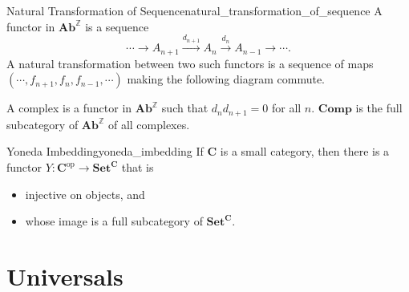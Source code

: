 \documentclass{article}
\begin{document}
\begin{example}{Natural Transformation of Sequence}{natural_transformation_of_sequence}
    A functor in $\mathbf{Ab}^{\mathbb{Z}}$ is a sequence
    \[ \cdots \rightarrow A_{n+1} \xrightarrow{d_{n+1}} A_n \xrightarrow{d_n} A_{n-1} \rightarrow \cdots. \]
    A natural transformation between two such functors is a sequence of maps $(\cdots,f_{n+1},f_n,f_{n-1},\cdots)$ making the following diagram commute.
    \begin{center}
    \end{center}
    A complex is a functor in $\mathbf{Ab}^{\mathbb{Z}}$ such that $d_n d_{n+1} = 0$ for all $n$.
    $\mathbf{Comp}$ is the full subcategory of $\mathbf{Ab}^{\mathbb{Z}}$ of all complexes.
\end{example}

\begin{corollary}{Yoneda Imbedding}{yoneda_imbedding}
    If $\mathbf{C}$ is a small category, then there is a functor $Y:\mathbf{C}^{\mathrm{op}} \rightarrow \mathbf{Set}^{\mathbf{C}}$ that is
    \begin{itemize}
        \item injective on objects, and
        \item whose image is a full subcategory of $\mathbf{Set}^{\mathbf{C}}$.
    \end{itemize}
\end{corollary}

\section{Universals}
\end{document}
